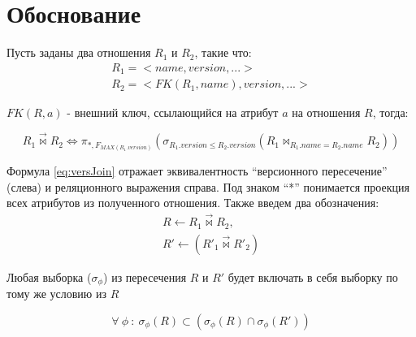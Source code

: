 \section{Обоснование}
\indent Пусть заданы два отношения $R_1$ и $R_2$, такие что:
\begin{multline*}
		R_1 = <name, version, ...>\\
		R_2 = <FK(R_1, name), version, ...>
\end{multline*}

\indent $FK(R, a)$ - внешний ключ, ссылающийся на атрибут $a$ на отношения $R$, тогда:\\


\begin{equation}\label{eq:versJoin}
	R_1\overrightarrow{\bowtie} R_2 \Leftrightarrow \pi_{*, F_{MAX(R_1.version)}}(\sigma_{R_1.version \leq R_2.version}(R_1 \bowtie_{R_1.name = R_2.name}R_2))
\end{equation}

\indent Формула \ref{eq:versJoin} отражает эквивалентность ``версионного пересечение'' (слева) и реляционного выражения справа.
Под знаком ``*'' понимается проекция всех атрибутов из полученного отношения.
Также введем два обозначения:
\begin{multline}
	R \leftarrow R_1 \overrightarrow{\bowtie} R_2,\\
	R' \leftarrow (R'_1 \overrightarrow{\bowtie} R'_2)
\end{multline}

\begin{theorem}
	Любая выборка ($\sigma_\phi$) из пересечения $R$ и $R'$ будет включать в себя выборку по тому же условию из $R$ 
\end{theorem}
\begin{equation}
	\forall\ \phi\ :\ \sigma_\phi(R) \subset (\sigma_\phi(R) \cap \sigma_\phi(R'))
\end{equation}


